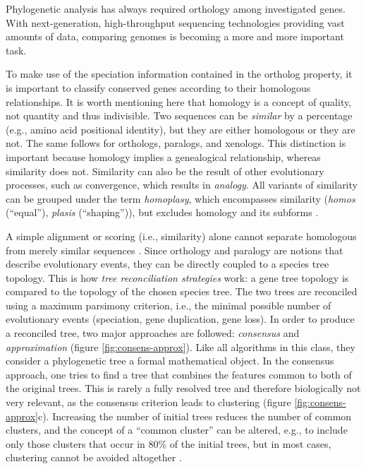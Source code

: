 Phylogenetic analysis has always required orthology among investigated genes.
With next-generation, high-throughput sequencing technologies providing vast
amounts of data, comparing genomes is becoming a more and more important task. 

To make use of the speciation information contained in the ortholog property, it
is important to classify conserved genes according to their homologous
relationships. It is worth mentioning here that homology is a concept of
quality, not quantity \citep{reeck1987} and thus indivisible. Two sequences can
be \emph{similar} by a percentage (e.g., amino acid positional identity), but
they are either homologous or they are not. The same follows for orthologs,
paralogs, and xenologs. This distinction is important because homology implies a
genealogical relationship, whereas similarity does not. Similarity can also be
the result of other evolutionary processes, such as convergence, which results
in \emph{analogy}. All variants of similarity can be grouped under the term
\emph{homoplasy}, which encompasses similarity (\emph{homos} (``equal''),
\emph{plasis} (``shaping'')), but excludes homology and its subforms
\citep{page1998}.

A simple alignment or scoring (i.e., similarity) alone cannot separate
homologous from merely similar sequences \citep{eisen1998}. Since orthology and
paralogy are notions that describe evolutionary events, they can be directly
coupled to a species tree topology. This is how \emph{tree reconciliation
strategies} work: a gene tree topology is compared to the topology of the chosen
species tree. The two trees are reconciled using a maximum parsimony criterion,
i.e., the minimal possible number of evolutionary events (speciation, gene
duplication, gene loss). In order to produce a reconciled tree, two major
approaches are followed: \emph{consensus} and \emph{approximation} (figure
\ref{fig:consens-approx}). Like all algorithms in this class, they consider a
phylogenetic tree a formal mathematical object. In the consensus approach, one
tries to find a tree that combines the features common to both of the original
trees. This is rarely a fully resolved tree and therefore biologically not very
relevant, as the consensus criterion leads to clustering (figure
\ref{fig:consens-approx}c). Increasing the number of initial trees reduces the
number of common clusters, and the concept of a ``common cluster'' can be
altered, e.g., to include only those clusters that occur in 80\% of the initial
trees, but in most cases, clustering cannot be avoided altogether
\citep{mirkin1995}.

